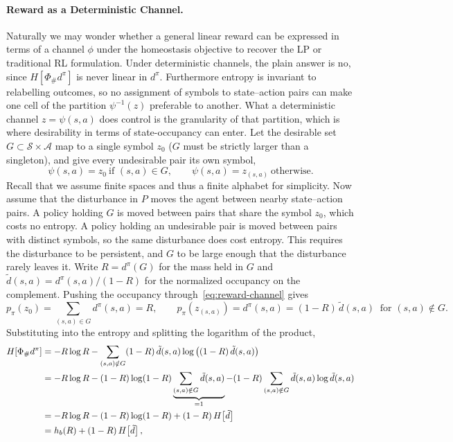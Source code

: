 \documentclass[11pt]{article}
\theoremstyle{remark}
\newcommand{\Acal}{\mathcal A}
\newcommand{\Scal}{\mathcal S}
\newcommand{\1}{\mathds{1}}
\newcommand{\occ}{d^{\pi}}
\newcommand{\push}{\Phi_{\#}}
\newcommand{\pz}{p_{\pi}}
\newcommand{\Hf}[1]{H\!\left[#1\right]}
\begin{document}
\paragraph{Reward as a Deterministic Channel.}
Naturally we may wonder whether a general linear reward can be expressed in terms of a channel $\phi$ under the homeostasis objective to recover the LP or traditional RL formulation.
Under deterministic channels, the plain answer is no, since $\Hf{\push\occ}$ is never linear in $\occ$.
Furthermore entropy is invariant to relabelling outcomes, so no assignment of symbols to state--action pairs can make one cell of the partition $\psi^{-1}(z)$ preferable to another.
What a deterministic channel $z=\psi(s,a)$ does control is the granularity of that partition, which is where desirability in terms of state-occupancy can enter.
Let the desirable set $G\subset\Scal\times\Acal$ map to a single symbol $z_0$ ($G$ must be strictly larger than a singleton), and give every undesirable pair its own symbol,
\begin{equation}
  \psi(s,a)=z_0 \ \text{if } (s,a)\in G,
  \qquad
  \psi(s,a)=z_{(s,a)} \ \text{otherwise}.
  \label{eq:reward-channel}
\end{equation}
Recall that we assume finite spaces and thus a finite alphabet for simplicity.
Now assume that the disturbance in $P$ moves the agent between nearby state--action pairs.
A policy holding $G$ is moved between pairs that share the symbol $z_0$, which costs no entropy.
A policy holding an undesirable pair is moved between pairs with distinct symbols, so the same disturbance does cost entropy.
This requires the disturbance to be persistent, and $G$ to be large enough that the disturbance rarely leaves it.
Write $R=\occ(G)$ for the mass held in $G$ and $\tilde d(s,a)=\occ(s,a)/(1-R)$ for the normalized occupancy on the complement.
Pushing the occupancy through~\eqref{eq:reward-channel} gives
\begin{equation}
  \pz(z_0)=\sum_{(s,a)\in G}\occ(s,a)=R,
  \qquad
  \pz(z_{(s,a)})=\occ(s,a)=(1-R)\,\tilde d(s,a)\ \text{ for } (s,a)\notin G .
\end{equation}
Substituting into the entropy and splitting the logarithm of the product,
\begin{align}
  \Hf{\push\occ}
  &=-R\log R-\sum_{(s,a)\notin G}(1-R)\,\tilde d(s,a)\log\big((1-R)\,\tilde d(s,a)\big) \notag\\
  &=-R\log R-(1-R)\log(1-R)\underbrace{\sum_{(s,a)\notin G}\tilde d(s,a)}_{=1}-(1-R)\sum_{(s,a)\notin G}\tilde d(s,a)\log\tilde d(s,a) \notag\\
  &=-R\log R-(1-R)\log(1-R)+(1-R)\,\Hf{\tilde d} \notag\\
  &=h_b(R)+(1-R)\,\Hf{\tilde d},
  \label{eq:det-channel-entropy}
\end{align}
\end{document}
